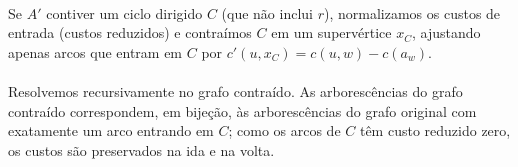 \documentclass[12pt,a4paper]{article}
\def\emph#1{#1}%
\begin{document}
\paragraph{}
Se \(A'\) contiver um ciclo dirigido \(C\) (que não inclui \(r\)), normalizamos os custos de entrada (custos reduzidos) e \emph{contraímos} \(C\) em um supervértice \(x_C\), ajustando apenas arcos que \emph{entram} em \(C\) por \(c'(u,x_C)=c(u,w)-c(a_w)\). 

\paragraph{}
Resolvemos recursivamente no grafo contraído. As arborescências do grafo contraído correspondem, em bijeção, às arborescências do grafo original com exatamente um arco entrando em \(C\); como os arcos de \(C\) têm custo reduzido zero, os custos são preservados na ida e na volta. 
\end{document}
